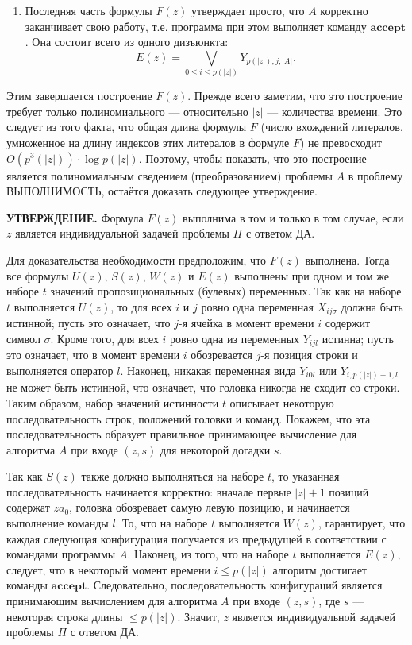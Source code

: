 \documentclass[a4paper,12pt]{article}
\begin{document}
\begin{enumerate}
    \item Последняя часть формулы \(F(z)\) утверждает просто, что \(A\) корректно заканчивает свою работу, т.е. программа при этом выполняет команду \(\textbf{accept}\). Она состоит всего из одного дизъюнкта:
    \[
    E(z) = \bigvee_{0 \le i \le p(|z|)} Y_{p(|z|), j, |A|}.
    \]
\end{enumerate}

Этим завершается построение \(F(z)\). Прежде всего заметим, что это построение требует только полиномиального --- относительно \(|z|\) --- количества времени. Это следует из того факта, что общая длина формулы \(F\) (число вхождений литералов, умноженное на длину индексов этих литералов в формуле \(F\)) не превосходит \(O(p^3(|z|)) \cdot \log p(|z|)\). Поэтому, чтобы показать, что это построение является полиномиальным сведением (преобразованием) проблемы \(A\) в проблему ВЫПОЛНИМОСТЬ, остаётся доказать следующее утверждение.

\textbf{УТВЕРЖДЕНИЕ.} Формула \(F(z)\) выполнима в том и только в том случае, если \(z\) является индивидуальной задачей проблемы \(\Pi\) с ответом ДА.

Для доказательства необходимости предположим, что \(F(z)\) выполнена. Тогда все формулы \(U(z)\), \(S(z)\), \(W(z)\) и \(E(z)\) выполнены при одном и том же наборе \(t\) значений пропозициональных (булевых) переменных. Так как на наборе \(t\) выполняется \(U(z)\), то для всех \(i\) и \(j\) ровно одна переменная \(X_{ij\sigma}\) должна быть истинной; пусть это означает, что \(j\)-я ячейка в момент времени \(i\) содержит символ \(\sigma\). Кроме того, для всех \(i\) ровно одна из переменных \(Y_{ijl}\) истинна; пусть это означает, что в момент времени \(i\) обозревается \(j\)-я позиция строки и выполняется оператор \(l\). Наконец, никакая переменная вида \(Y_{i0l}\) или \(Y_{i, p(|z|)+1, l}\) не может быть истинной, что означает, что головка никогда не сходит со строки. Таким образом, набор значений истинности \(t\) описывает некоторую последовательность строк, положений головки и команд. Покажем, что эта последовательность образует правильное принимающее вычисление для алгоритма \(A\) при входе \((z, s)\) для некоторой догадки \(s\).

Так как \(S(z)\) также должно выполняться на наборе \(t\), то указанная последовательность начинается корректно: вначале первые \(|z| + 1\) позиций содержат \(z a_0\), головка обозревает самую левую позицию, и начинается выполнение команды \(l\). То, что на наборе \(t\) выполняется \(W(z)\), гарантирует, что каждая следующая конфигурация получается из предыдущей в соответствии с командами программы \(A\). Наконец, из того, что на наборе \(t\) выполняется \(E(z)\), следует, что в некоторый момент времени \(i \le p(|z|)\) алгоритм достигает команды \(\textbf{accept}\). Следовательно, последовательность конфигураций является принимающим вычислением для алгоритма \(A\) при входе \((z, s)\), где \(s\) --- некоторая строка длины \(\le p(|z|)\). Значит, \(z\) является индивидуальной задачей проблемы \(\Pi\) с ответом ДА.
\end{document}
